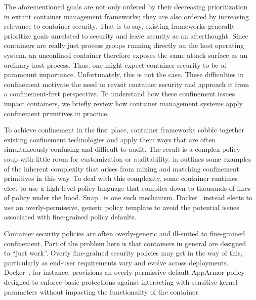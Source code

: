 The aforementioned goals are not only ordered by their decreasing prioritization in extant
container management frameworks; they are also ordered by increasing relevance to
container security. That is to say, existing frameworks generally prioritize goals
unrelated to security and leave security as an afterthought. Since containers are really
just process groups running directly on the host operating system, an unconfined container
therefore exposes the same attack surface as an ordinary host process. Thus, one might
expect container security to be of paramount importance. Unfortunately, this is not the
case. These difficulties in confinement motivate the need to revisit container security
and approach it from a confinement-first perspective. To understand how these confinement
issues impact containers, we briefly review how container management systems apply
confinement primitives in practice.

To achieve confinement in the first place, container frameworks cobble together existing
confinement technologies and apply them ways that are often simultaneously confusing and
difficult to audit. The result is a complex policy soup with little room for customization
or auditability.  in  outlines some examples
of the inherent complexity that arises from mixing and matching confinement primitives in
this way. To deal with this complexity, some container runtimes elect to use a high-level
policy language that compiles down to thousands of lines of policy under the hood. Snap~\cite{snap}
is one such mechanism. Docker~\cite{docker_security, docker_default_apparmor, docker_apparmor} instead
elects to use an overly-permissive, generic policy template to avoid the potential issues
associated with fine-grained policy defaults.


Container security policies are often overly-generic and ill-suited to fine-grained
confinement. Part of the problem here is that containers in general are designed to
\enquote{just work}. Overly fine-grained security policies may get in the way of this,
particularly as end-user requirements vary and evolve across deployments.
Docker~\cite{docker_security}, for instance, provisions an overly-permissive default
AppArmor policy~\cite{docker_default_apparmor} designed to enforce basic protections
against interacting with sensitive kernel parameters without impacting the functionality
of the container.

